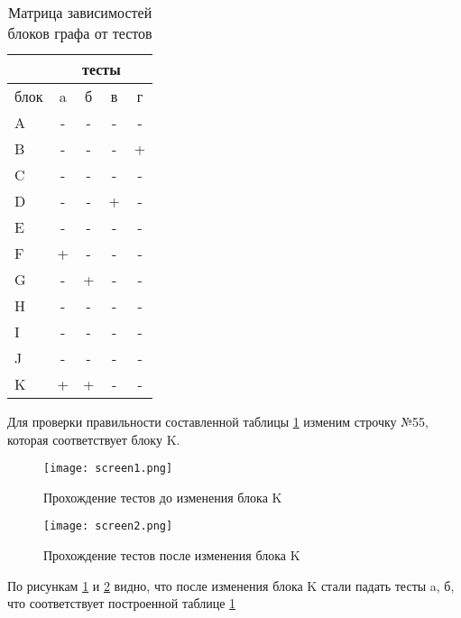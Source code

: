 \begin{table}[H] 
\caption{\label{tab:block_graph-test} Матрица зависимостей блоков графа от тестов}
\begin{center}
\begin{tabular}{|l|c|c|c|c|}

\hline
 & \multicolumn{4}{|c|}{тесты} \\
\hline
блок & a & б & в & г\\
\hline
A & - & - & - & -\\
\hline
B & - & - & - & +\\
\hline
C & - & - & - & -\\
\hline
D & - & - & + & -\\
\hline
E & - & - & - & -\\
\hline
F & + & - & - & -\\
\hline
G & - & + & - & -\\
\hline
H & - & - & - & -\\
\hline
I & - & - & - & -\\
\hline
J & - & - & - & -\\
\hline
K & + & + & - & -\\
\hline
\end{tabular}
\end{center}
\end{table} 

Для проверки правильности составленной таблицы \ref{tab:block_graph-test} изменим строчку №55, которая соответствует блоку K. 

\begin{figure}[H]
  \centering
  \texttt{[image: screen1.png]}
  \caption{Прохождение тестов до изменения блока K}
  \label{image:before-edit}
\end{figure}

\begin{figure}[H]
  \centering
  \texttt{[image: screen2.png]}
  \caption{Прохождение тестов после изменения блока K}
  \label{image:after-edit}
\end{figure}

По рисункам \ref{image:before-edit} и \ref{image:after-edit} видно, что после изменения блока K стали падать тесты a, б, что соответствует построенной таблице \ref{tab:block_graph-test}
